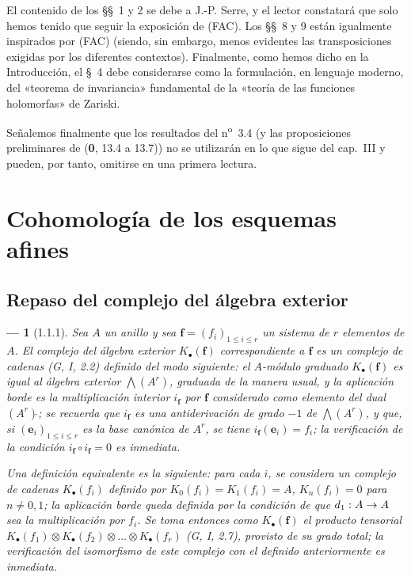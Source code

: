 \documentclass[10pt,oneside,openany]{book}
\theoremstyle{egaenv}\newtheorem*{env}{---}
\theoremstyle{egastatement}
\theoremstyle{egadescription}
\newcommand{\oldpage}[2][]{\marginnote{\normalfont\scriptsize\textbf{#1}\,|\,#2}\ignorespaces}
\renewcommand{\leq}{\leqslant}
\renewcommand{\to}{\mathchoice{\longrightarrow}{\rightarrow}{\rightarrow}{\rightarrow}}
\begin{document}

\oldpage[III]{82}
El contenido de los \S\S~1 y 2 se debe a J.-P. Serre, y el lector constatará que solo hemos tenido que seguir la exposición de (FAC). Los \S\S~8 y 9 están igualmente inspirados por (FAC) (siendo, sin embargo, menos evidentes las transposiciones exigidas por los diferentes contextos). Finalmente, como hemos dicho en la Introducción, el \S~4 debe considerarse como la formulación, en lenguaje moderno, del «teorema de invariancia» fundamental de la «teoría de las funciones holomorfas» de Zariski.

Señalemos finalmente que los resultados del n\textsuperscript{o}~3.4 (y las proposiciones preliminares de (\textbf{0}, 13.4 a 13.7)) no se utilizarán en lo que sigue del cap.~III y pueden, por tanto, omitirse en una primera lectura.

\setcounter{section}{0}


\section{Cohomología de los esquemas afines}
\label{section:III.1}
\label{section:III.1-fr}

\subsection{Repaso del complejo del álgebra exterior}
\label{subsection:III.1.1}
\label{subsection:III.1.1-fr}

\begin{env}[1.1.1]
\label{III.1.1.1}
\label{III.1.1.1-fr}
Sea $A$ un anillo y sea $\mathbf f=(f_i)_{1\leq i\leq r}$ un sistema de $r$ elementos de $A$.
El \emph{complejo del álgebra exterior $K_\bullet(\mathbf f)$} correspondiente a $\mathbf f$ es un complejo de cadenas (G, I, 2.2) definido del modo siguiente: el $A$-módulo graduado $K_\bullet(\mathbf f)$ es igual al \emph{álgebra exterior $\bigwedge(A^r)$}, graduada de la manera usual, y la aplicación borde es la \emph{multiplicación interior $i_{\mathbf f}$} por $\mathbf f$ considerado como elemento del dual $(A^r)\check{}$; se recuerda que $i_{\mathbf f}$ es una \emph{antiderivación} de grado $-1$ de $\bigwedge(A^r)$, y que, si $(\mathbf e_i)_{1\leq i\leq r}$ es la base canónica de $A^r$, se tiene $i_{\mathbf f}(\mathbf e_i)=f_i$; la verificación de la condición $i_{\mathbf f}\circ i_{\mathbf f}=0$ es inmediata.

Una definición equivalente es la siguiente: para cada $i$, se considera un complejo de cadenas $K_\bullet(f_i)$ definido por $K_0(f_i)=K_1(f_i)=A$, $K_n(f_i)=0$ para $n\neq0,1$; la aplicación borde queda definida por la condición de que $d_1:A\to A$ sea la \emph{multiplicación por $f_i$}.
Se toma entonces como $K_\bullet(\mathbf f)$ el \emph{producto tensorial $K_\bullet(f_1)\otimes K_\bullet(f_2)\otimes\ldots\otimes K_\bullet(f_r)$} (G, I, 2.7), provisto de su grado total; la verificación del isomorfismo de este complejo con el definido anteriormente es inmediata.
\end{env}
\end{document}
